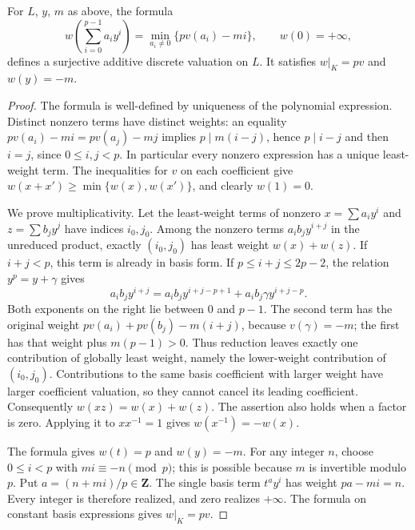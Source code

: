 \begin{lemma}
\label{lem:artin-schreier-weighted-valuation}
\leanok
For $L$, $y$, $m$ as above, the formula
\[
 w\left(\sum_{i=0}^{p-1}a_i y^i\right)
   =\min_{a_i\ne0}\{p v(a_i)-mi\},\qquad w(0)=+\infty,
\]
defines a surjective additive discrete valuation on $L$.
It satisfies $w|_K=p v$ and $w(y)=-m$.
\end{lemma}

\begin{proof}
The formula is well-defined by uniqueness of the polynomial
expression. Distinct nonzero terms have distinct weights: an
equality $p v(a_i)-mi=p v(a_j)-mj$ implies $p\mid m(i-j)$,
hence $p\mid i-j$ and then $i=j$, since $0\le i,j<p$.
In particular every nonzero expression has a unique least-weight
term. The inequalities for $v$ on each coefficient give
$w(x+x')\ge\min\{w(x),w(x')\}$, and clearly $w(1)=0$.

We prove multiplicativity. Let the least-weight terms of nonzero
$x=\sum a_i y^i$ and $z=\sum b_j y^j$ have indices $i_0,j_0$.
Among the nonzero terms $a_i b_j y^{i+j}$ in the unreduced
product, exactly $(i_0,j_0)$ has least weight
$w(x)+w(z)$. If $i+j<p$, this term is already in basis form.
If $p\le i+j\le2p-2$, the relation $y^p=y+\gamma$ gives
\[
 a_i b_j y^{i+j}
   =a_i b_j y^{i+j-p+1}
      +a_i b_j\gamma y^{i+j-p}.
\]
Both exponents on the right lie between $0$ and $p-1$.
The second term has the original weight
$p v(a_i)+p v(b_j)-m(i+j)$, because $v(\gamma)=-m$;
the first has that weight plus $m(p-1)>0$.
Thus reduction leaves exactly one contribution of globally least
weight, namely the lower-weight contribution of $(i_0,j_0)$.
Contributions to the same basis coefficient with larger weight
have larger coefficient valuation, so they cannot cancel its
leading coefficient. Consequently
$w(xz)=w(x)+w(z)$. The assertion also holds when a factor is zero.
Applying it to $xx^{-1}=1$ gives $w(x^{-1})=-w(x)$.

The formula gives $w(t)=p$ and $w(y)=-m$. For any integer $n$,
choose $0\le i<p$ with $mi\equiv-n\pmod p$; this is possible
because $m$ is invertible modulo $p$. Put $a=(n+mi)/p\in\mathbf Z$.
The single basis term $t^a y^i$ has weight $pa-mi=n$.
Every integer is therefore realized, and zero realizes $+\infty$.
The formula on constant basis expressions gives $w|_K=p v$.
\end{proof}

